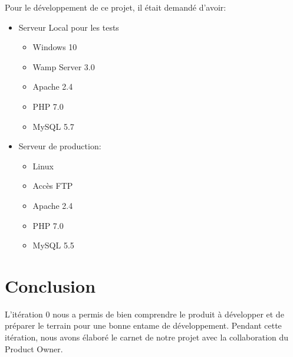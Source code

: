 Pour le développement de ce projet, il était demandé d'avoir:

\begin{itemize}
    \item Serveur Local pour les tests
        \begin{itemize}
            \item Windows 10
            \item Wamp Server 3.0
            \item Apache 2.4
            \item PHP 7.0
            \item MySQL 5.7
        \end{itemize}
    \item Serveur de production:
        \begin{itemize}
            \item Linux
            \item Accès FTP
            \item Apache 2.4
            \item PHP 7.0
            \item MySQL 5.5
        \end{itemize}
\end{itemize}

\section*{Conclusion}

L'itération 0 nous a permis de bien comprendre le produit à développer et de
préparer le terrain pour une bonne entame de développement. Pendant cette
itération, nous avons élaboré le carnet de notre projet avec la collaboration
du Product Owner.
